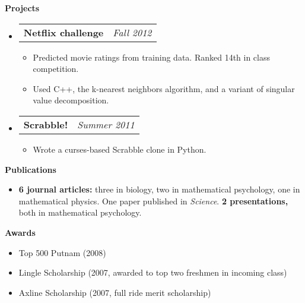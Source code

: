 \documentclass[letterpaper,11pt]{article}
\makeatletter
\newcommand{\resitem}[1]{\item #1 \vspace{-2pt}}
\newcommand{\resheading}[1]{{\large \colorbox{mygrey}{\begin{minipage}{\textwidth}{\textbf{#1 \vphantom{p\^{E}}}}\end{minipage}}}}
\newcommand{\ressubheading}[4]{
\begin{tabular*}{7.0in}{l@{\extracolsep{\fill}}r}
		\textbf{#1} & \textit{#4} \\
\end{tabular*}\vspace{-6pt}}
\makeatother
\begin{document}
\resheading{Projects}
\begin{itemize}
\item
	\ressubheading{Netflix challenge}{Pasadena, CA}{Student}{Fall 2012}
	\begin{itemize}
		\resitem{Predicted movie ratings from training data.  Ranked 14th in class competition.}
		\resitem{Used C++, the k-nearest neighbors algorithm, and a variant of singular value decomposition.}
	\end{itemize}
\item
	\ressubheading{Scrabble!}{Pasadena, CA}{Self-employed}{Summer 2011}
	\begin{itemize}
		\resitem{Wrote a curses-based Scrabble clone in Python.}
	\end{itemize}
\end{itemize}
\resheading{Publications}
\begin{itemize}
	\item {\bf 6 journal articles:} three in biology, two in mathematical psychology, one in mathematical physics.  One paper published in \emph{Science}.  {\bf 2 presentations,} both in mathematical psychology.
\end{itemize}

\resheading{Awards}
\begin{itemize}
	\item Top 500 Putnam (2008)
	\item Lingle Scholarship (2007, awarded to top two freshmen in incoming class)
	\item Axline Scholarship (2007, full ride merit scholarship)
\end{itemize}
\end{document}
